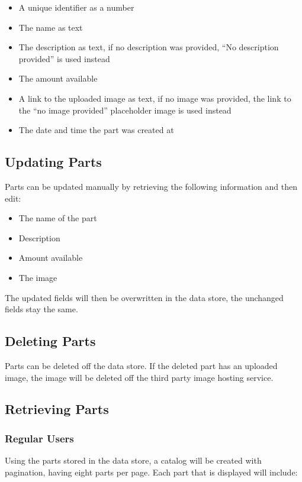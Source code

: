 \documentclass[12pt, letterpaper]{article}
\begin{document}
\begin{itemize}
  \item A unique identifier as a number
  \item The name as text
  \item The description as text, if no description was provided, ``No description provided'' is used instead
  \item The amount available
  \item A link to the uploaded image as text, if no image was provided, the link to the ``no image provided'' placeholder image is used instead
  \item The date and time the part was created at
\end{itemize}

\subsection{Updating Parts}
Parts can be updated manually by retrieving the following information and then edit:

\begin{itemize}
  \item The name of the part
  \item Description
  \item Amount available
  \item The image
\end{itemize}

The updated fields will then be overwritten in the data store, the unchanged fields stay the same.

\subsection{Deleting Parts}
Parts can be deleted off the data store. If the deleted part has an uploaded image, the image will be deleted off the third party image hosting service.

\subsection{Retrieving Parts}

\subsubsection{Regular Users}
Using the parts stored in the data store, a catalog will be created with pagination, having eight parts per page. Each part that is displayed will include:
\end{document}

